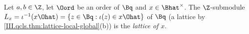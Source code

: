 Let $a,b\in\Z$, let $\Oord$ be an order of $\Bq$ and $x\in\Bhat^\times$. The $\Z$-submodule $L_x=\iota^{-1}(x\Ohat)=\{z\in\Bq:\iota(z)\in x\Ohat\}$ of $\Bq$
(a lattice by \cref{III.qcls.thm:lattice-local-global}(b)) is the \emph{lattice of $x$}.
